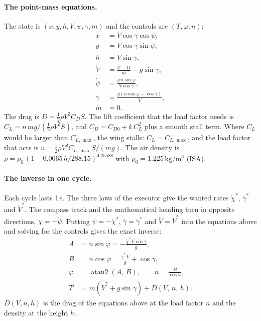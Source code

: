 \paragraph{The point-mass equations.} The state is $(x, y, h, V, \psi, \gamma, m)$ and the controls are $(T, \varphi, n)$:
\begin{align}
\dot{x} &= V \cos\gamma \cos\psi, \\
\dot{y} &= V \cos\gamma \sin\psi, \\
\dot{h} &= V \sin\gamma, \\
\dot{V} &= \frac{T - D}{m} - g \sin\gamma, \\
\dot{\psi} &= \frac{g\, n \sin\varphi}{V \cos\gamma}, \\
\dot{\gamma} &= \frac{g\left(n \cos\varphi - \cos\gamma\right)}{V}, \\
\dot{m} &= 0.
\end{align}
The drag is $D = \tfrac{1}{2}\rho V^{2} C_D S$. The lift coefficient that the load factor needs is
$C_L = n\, m g / (\tfrac{1}{2}\rho V^{2} S)$, and $C_D = C_{D0} + k\, C_L^{2}$ plus a smooth stall term. Where $C_L$ would be
larger than $C_{L,\max}$, the wing stalls: $C_L = C_{L,\max}$, and the load factor that acts is
$n = \tfrac{1}{2}\rho V^{2} C_{L,\max} S / (m g)$. The air density is $\rho = \rho_0\,(1 - 0.0065\,h / 288.15)^{4.25588}$
with $\rho_0 = 1.225$\,kg/m$^3$ (ISA).

\paragraph{The inverse in one cycle.} Each cycle lasts 1\,s. The three laws of the executor give the wanted rates
$\dot{\chi}^{*}$, $\dot{\gamma}^{*}$ and $\dot{V}^{*}$. The compass track and the mathematical heading turn in opposite
directions, $\dot{\chi} = -\dot{\psi}$. Putting $\dot{\psi} = -\dot{\chi}^{*}$, $\dot{\gamma} = \dot{\gamma}^{*}$ and
$\dot{V} = \dot{V}^{*}$ into the equations above and solving for the controls gives the exact inverse:
\begin{align}
A &= n \sin\varphi = -\frac{\dot{\chi}^{*}\, V \cos\gamma}{g}, \\[4pt]
B &= n \cos\varphi = \frac{\dot{\gamma}^{*}\, V}{g} + \cos\gamma, \\[4pt]
\varphi &= \operatorname{atan2}(A,\, B), \qquad n = \frac{B}{\cos\varphi}, \\[4pt]
T &= m\left(\dot{V}^{*} + g \sin\gamma\right) + D(V,\, n,\, h).
\end{align}
$D(V, n, h)$ is the drag of the equations above at the load factor $n$ and the density at the height $h$.

